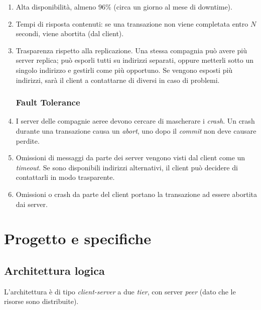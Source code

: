 \documentclass[a4paper]{article}
\begin{document}
\begin{enumerate}
	\item Alta disponibilità, almeno $96\%$ (circa un giorno al mese di downtime).
	\item Tempi di risposta contenuti: se una transazione non viene completata entro $N$ secondi, viene abortita (dal client).
		\item Trasparenza rispetto alla replicazione. Una stessa compagnia può avere più server replica; può esporli tutti su indirizzi separati, oppure metterli sotto un singolo indirizzo e gestirli come più opportuno. Se vengono esposti più indirizzi, sarà il client a contattarne di diversi in caso di problemi.
\subsubsection{Fault Tolerance}
	\item I server delle compagnie aeree devono cercare di mascherare i \textit{crash}. Un crash durante una transazione causa un \textit{abort}, uno dopo il \textit{commit} non deve causare perdite.
	\item Omissioni di messaggi da parte dei server vengono visti dal client come un \textit{timeout}. Se sono disponibili indirizzi alternativi, il client può decidere di contattarli in modo trasparente.
	\item Omissioni o crash da parte del client portano la transazione ad essere abortita dai server.
\end{enumerate}


\section{Progetto e specifiche}

\subsection{Architettura logica}

L'architettura è di tipo \textit{client-server} a due \textit{tier}, con server \textit{peer} (dato che le risorse sono distribuite).
\end{document}
